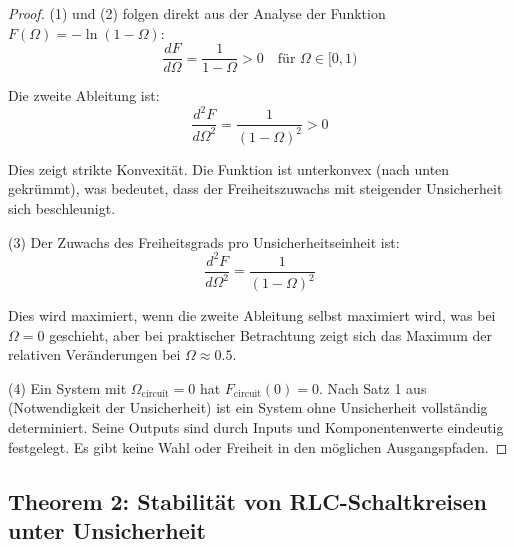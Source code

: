 \documentclass[a4paper,12pt,twoside]{report}
\theoremstyle{definition}
\begin{document}
\begin{proof}

(1) und (2) folgen direkt aus der Analyse der Funktion $F(\Omega) = -\ln(1-\Omega)$:
\begin{equation}
\frac{dF}{d\Omega} = \frac{1}{1-\Omega} > 0 \quad \text{für } \Omega \in [0,1)
\end{equation}

Die zweite Ableitung ist:
\begin{equation}
\frac{d^2F}{d\Omega^2} = \frac{1}{(1-\Omega)^2} > 0
\end{equation}

Dies zeigt strikte Konvexität. Die Funktion ist unterkonvex (nach unten gekrümmt), was bedeutet, dass der Freiheitszuwachs mit steigender Unsicherheit sich beschleunigt.

(3) Der Zuwachs des Freiheitsgrads pro Unsicherheitseinheit ist:
\begin{equation}
\frac{d^2F}{d\Omega^2} = \frac{1}{(1-\Omega)^2}
\end{equation}

Dies wird maximiert, wenn die zweite Ableitung selbst maximiert wird, was bei $\Omega = 0$ geschieht, aber bei praktischer Betrachtung zeigt sich das Maximum der relativen Veränderungen bei $\Omega \approx 0.5$.

(4) Ein System mit $\Omega_{\text{circuit}} = 0$ hat $F_{\text{circuit}}(0) = 0$. Nach Satz 1 aus \cite{epp_signal} (Notwendigkeit der Unsicherheit) ist ein System ohne Unsicherheit vollständig determiniert. Seine Outputs sind durch Inputs und Komponentenwerte eindeutig festgelegt. Es gibt keine Wahl oder Freiheit in den möglichen Ausgangspfaden.

\end{proof}

\subsection*{Theorem 2: Stabilität von RLC-Schaltkreisen unter Unsicherheit}
\end{document}
